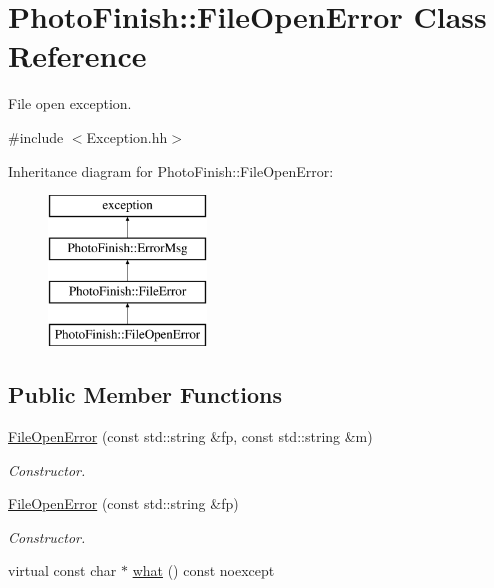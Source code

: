 \hypertarget{class_photo_finish_1_1_file_open_error}{}\section{Photo\+Finish\+:\+:File\+Open\+Error Class Reference}
\label{class_photo_finish_1_1_file_open_error}


File open exception.  




{\ttfamily \#include $<$Exception.\+hh$>$}

Inheritance diagram for Photo\+Finish\+:\+:File\+Open\+Error\+:\begin{figure}[H]
\begin{center}
\leavevmode
\includegraphics[height=4.000000cm]{class_photo_finish_1_1_file_open_error}
\end{center}
\end{figure}
\subsection*{Public Member Functions}
\begin{DoxyCompactItemize}
\item 
\hyperlink{class_photo_finish_1_1_file_open_error_a683da276a4bd5ba7d9fd4c609f93a22f}{File\+Open\+Error} (const std\+::string \&fp, const std\+::string \&m)
\begin{DoxyCompactList}\small\item\em Constructor. \end{DoxyCompactList}\item 
\hyperlink{class_photo_finish_1_1_file_open_error_aafdab17a05d3ccd006582a07f949173f}{File\+Open\+Error} (const std\+::string \&fp)
\begin{DoxyCompactList}\small\item\em Constructor. \end{DoxyCompactList}\item 
virtual const char $\ast$ \hyperlink{class_photo_finish_1_1_file_open_error_ab88924bbaf53b4ba6efda71d7a4d4baf}{what} () const noexcept
\end{DoxyCompactItemize}

